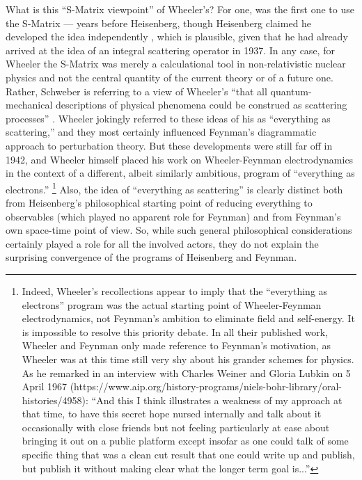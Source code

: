 \documentclass[12pt]{article}
\begin{document}
What is this ``S-Matrix viewpoint'' of Wheeler's? For one, \citet{wheeler_1937_on-the-mathematical} was the first one to use the S-Matrix --- years before Heisenberg, though Heisenberg claimed he developed the idea independently \citep{rechenberg_1989_the-early}, which is plausible, given that he had already arrived at the idea of an integral scattering operator in 1937. In any case, for Wheeler the S-Matrix was merely a calculational tool in non-relativistic nuclear physics and not the central quantity of the current theory or of a future one. Rather, Schweber is referring to a view of Wheeler's ``that all quantum-mechanical descriptions of physical phenomena could be construed as scattering processes'' \citep[p. 379]{schweber_1994_qed}. Wheeler jokingly referred to these ideas of his as ``everything as scattering,''  and they most certainly influenced Feynman's diagrammatic approach to perturbation theory. But these developments were still far off in 1942, and Wheeler himself placed his work on Wheeler-Feynman electrodynamics in the context of a different, albeit similarly ambitious, program of ``everything as electrons.'' \citep{wheeler_1989_the-young}\footnote{Indeed, Wheeler's recollections appear to imply that the ``everything as electrons'' program was the actual starting point of Wheeler-Feynman electrodynamics, not Feynman's ambition to eliminate field and self-energy. It is impossible to resolve this priority debate. In all their published work, Wheeler and Feynman only made reference to Feynman's motivation, as Wheeler was at this time still very shy about his grander schemes for physics. As he remarked in an interview with Charles Weiner and Gloria Lubkin on 5 April 1967 (https://www.aip.org/history-programs/niels-bohr-library/oral-histories/4958): ``And this I think illustrates a weakness of my approach at that time, to have this secret hope nursed internally and talk about it occasionally with close friends but not feeling particularly at ease about bringing it out on a public platform except insofar as one could talk of some specific thing that was a clean cut result that one could write up and publish, but publish it without making clear what the longer term goal is...'' } Also, the idea of ``everything as scattering'' is clearly distinct both from Heisenberg's philosophical starting point of reducing everything to observables (which played no apparent role for Feynman) and from Feynman's own space-time point of view. So, while such general philosophical considerations certainly played a role for all the involved actors, they do not explain the surprising convergence of the programs of Heisenberg and Feynman.
\end{document}
